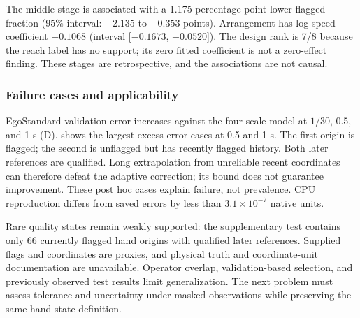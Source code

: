 The middle stage is associated with a 1.175-percentage-point lower flagged fraction (95\% interval: $-2.135$ to $-0.353$ points). Arrangement has log-speed coefficient $-0.1068$ (interval [$-0.1673$, $-0.0520$]). The design rank is 7/8 because the reach label has no support; its zero fitted coefficient is not a zero-effect finding. These stages are retrospective, and the associations are not causal.

\subsubsection{Failure cases and applicability}
EgoStandard validation error increases against the four-scale model at $1/30$, 0.5, and 1 s (D).  shows the largest excess-error cases at 0.5 and 1 s. The first origin is flagged; the second is unflagged but has recently flagged history. Both later references are qualified. Long extrapolation from unreliable recent coordinates can therefore defeat the adaptive correction; its bound does not guarantee improvement. These post hoc cases explain failure, not prevalence. CPU reproduction differs from saved errors by less than $3.1\times10^{-7}$ native units.

Rare quality states remain weakly supported: the supplementary test contains only 66 currently flagged hand origins with qualified later references. Supplied flags and coordinates are proxies, and physical truth and coordinate-unit documentation are unavailable. Operator overlap, validation-based selection, and previously observed test results limit generalization. The next problem must assess tolerance and uncertainty under masked observations while preserving the same hand-state definition.
